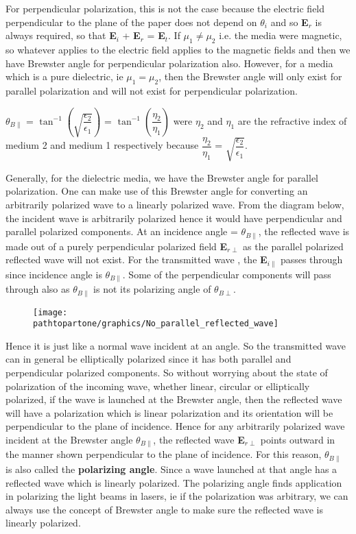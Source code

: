 For perpendicular polarization, this is not the case because the electric field perpendicular to the plane of the paper does not depend on $\theta_i$ and so \textbf{E}$_r$ is always required, so that \textbf{E}$_i$ + \textbf{E}$_r$ = \textbf{E}$_t$. If $\mu_1 \neq \mu_2$ i.e. the media were magnetic, so whatever applies to the electric field applies to the magnetic fields and then we have Brewster angle for perpendicular polarization also. However, for a media which is a pure dielectric, ie $\mu_1 = \mu_2$, then the Brewster angle will only exist for parallel polarization and will not exist for perpendicular polarization.

$\theta_{B\parallel}$ = $\tan^{-1}\left(\sqrt{\dfrac{\epsilon_2}{\epsilon_1}}\right)$ = $\tan^{-1}\left(\dfrac{\eta_2}{\eta_1}\right)$ were $\eta_2$ and $\eta_1$ are the refractive index of medium 2 and medium 1 respectively because $\dfrac{\eta_2}{\eta_1}$ = $\sqrt{\dfrac{\epsilon_2}{\epsilon_1}}$.

Generally, for the dielectric media, we have the Brewster angle for parallel polarization. One can make use of this Brewster angle for converting an arbitrarily polarized wave to a linearly polarized wave. From the diagram below, the incident wave is arbitrarily polarized hence it would have perpendicular and parallel polarized components. At an incidence angle = $\theta_{B\parallel}$, the reflected wave is made out of a purely perpendicular polarized field \textbf{E}$_{r\perp}$ as the parallel polarized reflected wave will not exist. For the transmitted wave , the \textbf{E}$_{i\parallel}$ passes through since incidence angle is $\theta_{B\parallel}$. Some of the perpendicular components will pass through also as $\theta_{B\parallel}$ is not its polarizing angle of $\theta_{B\perp}$.

\begin{figure}[h]
\centering
\texttt{[image: \\pathtopartone/graphics/No\_parallel\_reflected\_wave]}
\caption{}
\label{}
\end{figure}

Hence it is just like a normal wave incident at an angle. So the transmitted wave can in general be elliptically polarized since it has both parallel and perpendicular polarized components.
So without worrying about the state of polarization of the incoming wave, whether linear, circular or elliptically polarized, if the wave is launched at the Brewster angle, then the reflected wave will have a polarization which is linear polarization and its orientation will be perpendicular to the plane of incidence. Hence for any arbitrarily polarized wave incident at the Brewster angle $\theta_{B\parallel}$, the reflected wave \textbf{E}$_{r\perp}$ points outward in the manner shown perpendicular to the plane of incidence. For this reason, $\theta_{B\parallel}$ is also called the \textbf{polarizing angle}. Since a wave launched at that angle has a reflected wave which is linearly polarized. The polarizing angle finds application in polarizing the light beams in lasers, ie if the polarization was arbitrary, we can always use the concept of Brewster angle to make sure the reflected wave is linearly polarized. 


